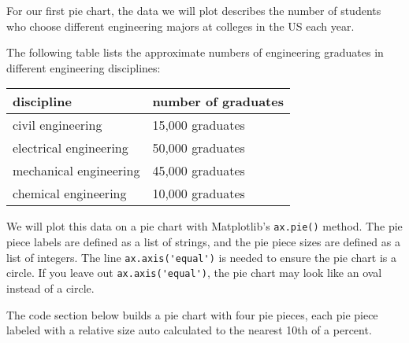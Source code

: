 \documentclass{book}
\newcommand{\passthrough}[1]{#1}
\begin{document}
For our first pie chart, the data we will plot describes the number of
students who choose different engineering majors at colleges in the US
each year.

The following table lists the approximate numbers of engineering
graduates in different engineering disciplines:

\begin{longtable}[]{@{}ll@{}}
\toprule
discipline & number of graduates\tabularnewline
\midrule
\endhead
civil engineering & 15,000 graduates\tabularnewline
electrical engineering & 50,000 graduates\tabularnewline
mechanical engineering & 45,000 graduates\tabularnewline
chemical engineering & 10,000 graduates\tabularnewline
\bottomrule
\end{longtable}

We will plot this data on a pie chart with Matplotlib's
\passthrough{\lstinline!ax.pie()!} method. The pie piece labels are
defined as a list of strings, and the pie piece sizes are defined as a
list of integers. The line \passthrough{\lstinline!ax.axis('equal')!} is
needed to ensure the pie chart is a circle. If you leave out
\passthrough{\lstinline!ax.axis('equal')!}, the pie chart may look like
an oval instead of a circle.

The code section below builds a pie chart with four pie pieces, each pie
piece labeled with a relative size auto calculated to the nearest 10th
of a percent.
    
\end{document}
